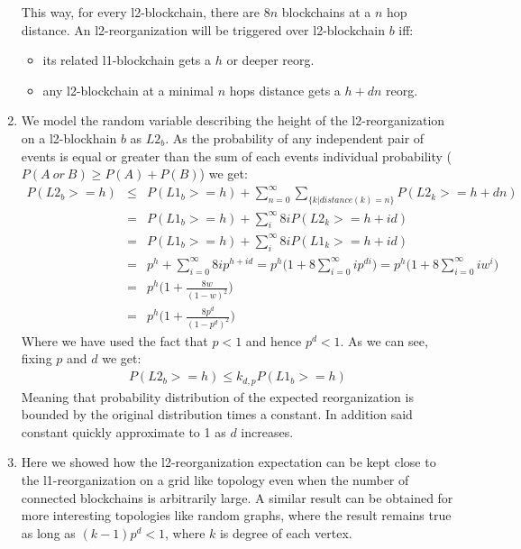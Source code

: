 \documentclass[120pt]{article}
\begin{document}
\begin{enumerate}
\begin{itemize}
\end{itemize}
This way, for every l2-blockchain, there are $8n$ blockchains at a $n$ hop distance. 
An l2-reorganization will be triggered over l2-blockchain $b$ iff:
\begin{itemize}
 \item its related l1-blockchain gets a $h$ or deeper reorg.
 \item any l2-blockchain at a minimal $n$ hops distance gets a $h + dn$ reorg.
\end{itemize}
\item We model the random variable describing the height of the l2-reorganization on a l2-blockhain $b$ as $L2_b$. As the probability of any independent pair of events is equal or greater than the sum of each events individual probability  ( $P(A \ or \ B) \ge P(A) + P(B)$) we get:
$$
\begin{array}{lcl}
P(L2_b >= h) & \le & P(L1_b >= h) + \sum\limits_{n = 0}^{\infty} \sum\limits_{ \{k | distance(k) = n \}} P(L2_k >= h + dn) \\
 & = & P(L1_b >= h) + \sum\limits_i^{\infty} 8i P(L2_k >= h + i d) \\
 & = & P(L1_b >= h) + \sum\limits_i^{\infty} 8i P(L1_k >= h + i d) \\
 & = & p^h + \sum\limits_{ i = 0 }^{\infty} 8ip^{ h + id} =  p^h \big( 1 + 8\sum\limits_{ i = 0 }^{\infty} ip^{di} \big) =  p^h \big( 1 + 8\sum\limits_{ i = 0 }^{\infty} iw^{i} \big) \\
 & = & p^h \big( 1 + \frac{8w}{(1 - w)^2} \big) \\
 & = & p^h \big( 1 + \frac{8p^d}{(1 - p^d)^2} \big)
\end{array}
$$
Where we have used the fact that $ p < 1$ and hence $ p^d < 1$.
As we can see, fixing $p$ and $d$ we get:
$$
\begin{array}{lcl}
P(L2_b >= h) \le k_{d,p} P(L1_b >= h)
\end{array}
$$
Meaning that probability distribution of the expected reorganization is bounded by the original distribution times a constant. In addition said constant quickly approximate to 1 as $d$ increases.
\item Here we showed how the l2-reorganization expectation can be kept close to the l1-reorganization on a grid like topology even when the number of connected blockchains is arbitrarily large. A similar result can be obtained for more interesting topologies like random graphs, where the result remains true as 	long as $ (k-1) p^d < 1$, where $k$ is degree of each vertex.
\end{enumerate}
\end{document}
